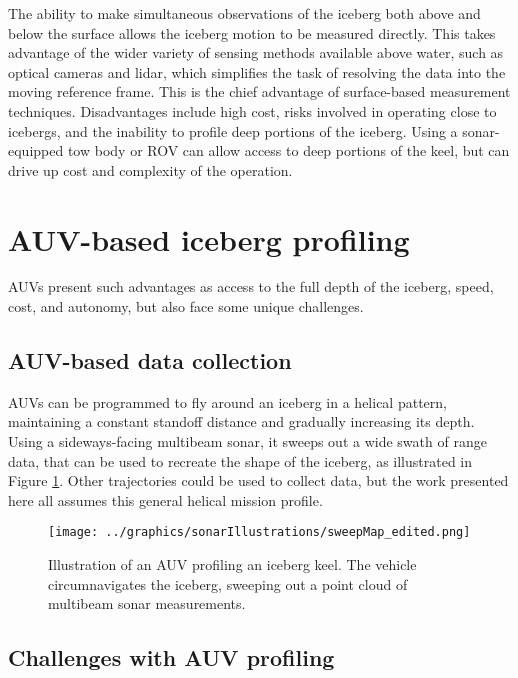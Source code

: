 The ability to make simultaneous observations of the iceberg both above and below the surface allows the iceberg motion to be measured directly. This takes advantage of the wider variety of sensing methods available above water, such as optical cameras and lidar, which simplifies the task of resolving the data into the moving reference frame. This is the chief advantage of surface-based measurement techniques. Disadvantages include high cost, risks involved in operating close to icebergs, and the inability to profile deep portions of the iceberg. Using a sonar-equipped tow body or ROV can allow access to deep portions of the keel, but can drive up cost and complexity of the operation. 


\section{AUV-based iceberg profiling}

AUVs present such advantages as access to the full depth of the iceberg, speed, cost, and autonomy, but also face some unique challenges.

\subsection{AUV-based data collection}

AUVs can be programmed to fly around an iceberg in a helical pattern, maintaining a constant standoff distance and gradually increasing its depth. Using a sideways-facing multibeam sonar, it sweeps out a wide swath of range data, that can be used to recreate the shape of the iceberg, as illustrated in Figure \ref{fig:introSetup}. Other trajectories could be used to collect data, but the work presented here all assumes this general helical mission profile.

\begin{figure}[!htb]
   \centering
   \texttt{[image: ../graphics/sonarIllustrations/sweepMap\_edited.png]} %
   \caption{Illustration of an AUV profiling an iceberg keel. The vehicle circumnavigates the iceberg, sweeping out a point cloud of multibeam sonar measurements. }
   \label{fig:introSetup}
\end{figure}


\subsection{Challenges with AUV profiling}

